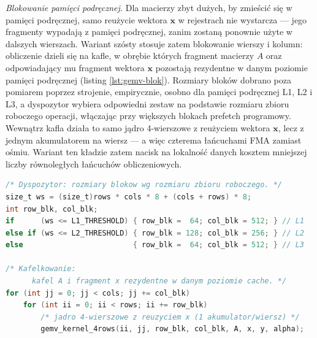 \documentclass[a4paper,12pt]{book} %
\begin{document}
\emph{Blokowanie pamięci podręcznej.} Dla macierzy zbyt dużych, by zmieścić się w pamięci podręcznej, samo reużycie wektora $\mathbf{x}$ w rejestrach nie wystarcza --- jego fragmenty wypadają z pamięci podręcznej, zanim zostaną ponownie użyte w dalszych wierszach. Wariant szósty stosuje zatem blokowanie wierszy i kolumn: obliczenie dzieli się na kafle, w obrębie których fragment macierzy $A$ oraz odpowiadający mu fragment wektora $\mathbf{x}$ pozostają rezydentne w danym poziomie pamięci podręcznej (listing \ref{lst:gemv-blok}). Rozmiary bloków dobrano poza pomiarem poprzez strojenie, empirycznie, osobno dla pamięci podręcznej L1, L2 i L3, a dyspozytor wybiera odpowiedni zestaw na podstawie rozmiaru zbioru roboczego operacji, włączając przy większych blokach prefetch programowy. Wewnątrz kafla działa to samo jądro 4-wierszowe z reużyciem wektora $\mathbf{x}$, lecz z jednym akumulatorem na wiersz --- a więc czterema łańcuchami FMA zamiast ośmiu. Wariant ten kładzie zatem nacisk na lokalność danych kosztem mniejszej liczby równoległych łańcuchów obliczeniowych.

\begin{lstfloat}[t!]
\begin{lstlisting}[language=C, caption={Mnożenie macierzy przez wektor --- szkic blokowania pamięci podręcznej: dyspozytor dobiera rozmiary bloków wg rozmiaru zbioru roboczego, a zagnieżdżone pętle przebiegają kafle kolumn i wierszy}, label={lst:gemv-blok}]
/* Dyspozytor: rozmiary blokow wg rozmiaru zbioru roboczego. */
size_t ws = (size_t)rows * cols * 8 + (cols + rows) * 8;
int row_blk, col_blk;
if      (ws <= L1_THRESHOLD) { row_blk =  64; col_blk = 512; } // L1 
else if (ws <= L2_THRESHOLD) { row_blk = 128; col_blk = 256; } // L2 
else                         { row_blk =  64; col_blk = 512; } // L3 

/* Kafelkowanie: 
      kafel A i fragment x rezydentne w danym poziomie cache. */
for (int jj = 0; jj < cols; jj += col_blk)
    for (int ii = 0; ii < rows; ii += row_blk)
        /* jadro 4-wierszowe z reuzyciem x (1 akumulator/wiersz) */
        gemv_kernel_4rows(ii, jj, row_blk, col_blk, A, x, y, alpha);
\end{lstlisting}
\end{lstfloat}
\end{document}
